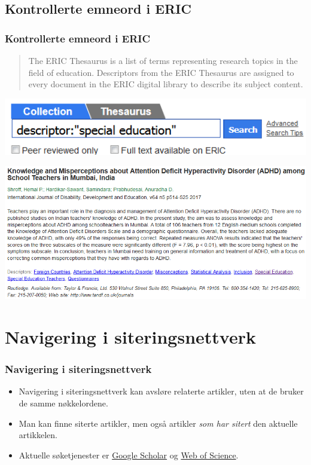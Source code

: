 \subsection{Kontrollerte emneord i ERIC}
\begin{frame}
  \frametitle{Kontrollerte emneord i ERIC}
  \begin{quote}
    The ERIC Thesaurus is a list of terms representing research topics in the field of education. Descriptors from the ERIC Thesaurus are \alert{assigned to every document} in the ERIC digital library to describe its subject content.
  \end{quote}
\end{frame}
\begin{frame}
  \centering
  \includegraphics[width=1\textwidth]{../media/eric-descriptor.png}
\end{frame}
\begin{frame}
  \centering
  \includegraphics[width=1\textwidth]{../media/eric-descriptor-2.png}
\end{frame}

\section{Navigering i siteringsnettverk}
\begin{frame}
  \frametitle{Navigering i siteringsnettverk}
  \begin{itemize}
    \item Navigering i siteringsnettverk kan avsløre relaterte artikler, uten at de bruker de samme nøkkelordene.
    \item Man kan finne siterte artikler, men også artikler \textit{som har sitert} den aktuelle artikkelen.
    \item Aktuelle søketjenester er \href{https://scholar.google.com}{Google Scholar} og \href{http://apps.webofknowledge.com}{Web of Science}.
  \end{itemize}
\end{frame}

